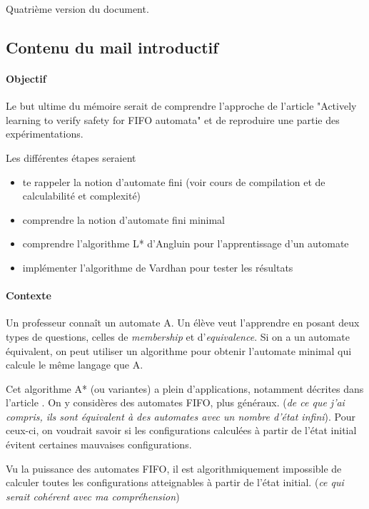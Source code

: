 Quatrième version du document.

\subsection*{Contenu du mail introductif}

\paragraph{Objectif}

Le but ultime du mémoire serait de comprendre l’approche de l’article "Actively learning to verify safety for FIFO automata" \cite{Vardhan04} et de reproduire une partie des expérimentations. 

Les différentes étapes seraient
\begin{itemize}
	\item te rappeler la notion d’automate fini (voir cours de compilation et de calculabilité et complexité)
	\item comprendre la notion d’automate fini minimal
	\item comprendre l’algorithme L* d’Angluin pour l’apprentissage d’un automate
	\item implémenter l'algorithme de Vardhan pour tester les résultats
\end{itemize}


\paragraph{Contexte}

Un professeur connaît un automate A. Un élève veut l'apprendre en posant deux types de questions, celles de \emph{membership} et d'\emph{equivalence}. Si on a un automate équivalent, on peut utiliser un algorithme pour obtenir l'automate minimal qui calcule le même langage que A.

Cet algorithme A* (ou variantes) a plein d'applications, notamment décrites dans l'article \cite{Vardhan04}. On y considères des automates FIFO, plus généraux. (\emph{de ce que j'ai compris, ils sont équivalent à des automates avec un nombre d'état infini}). Pour ceux-ci, on voudrait savoir si les configurations calculées à partir de l’état initial évitent certaines mauvaises configurations.

Vu la puissance des automates FIFO, il est algorithmiquement impossible de calculer toutes les configurations atteignables à partir de l’état initial. (\emph{ce qui serait cohérent avec ma compréhension})

